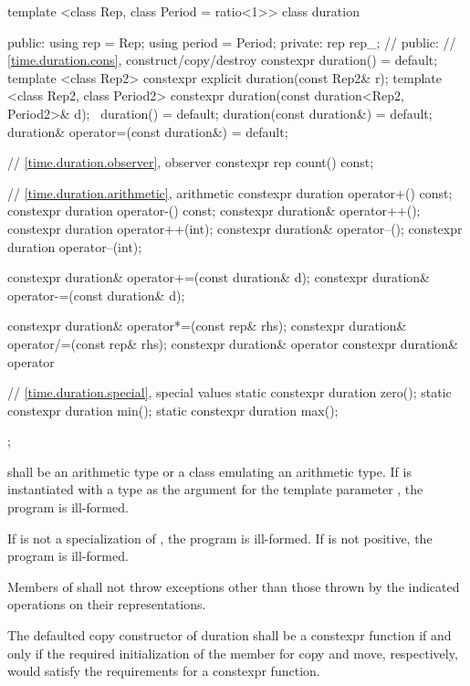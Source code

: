 %
\begin{codeblock}
template <class Rep, class Period = ratio<1>>
class duration {
public:
  using rep    = Rep;
  using period = Period;
private:
  rep rep_;  // \expos
public:
  // \ref{time.duration.cons}, construct/copy/destroy
  constexpr duration() = default;
  template <class Rep2>
      constexpr explicit duration(const Rep2& r);
  template <class Rep2, class Period2>
     constexpr duration(const duration<Rep2, Period2>& d);
  ~duration() = default;
  duration(const duration&) = default;
  duration& operator=(const duration&) = default;

  // \ref{time.duration.observer}, observer
  constexpr rep count() const;

  // \ref{time.duration.arithmetic}, arithmetic
  constexpr duration  operator+() const;
  constexpr duration  operator-() const;
  constexpr duration& operator++();
  constexpr duration  operator++(int);
  constexpr duration& operator--();
  constexpr duration  operator--(int);

  constexpr duration& operator+=(const duration& d);
  constexpr duration& operator-=(const duration& d);

  constexpr duration& operator*=(const rep& rhs);
  constexpr duration& operator/=(const rep& rhs);
  constexpr duration& operator%
  constexpr duration& operator%

  // \ref{time.duration.special}, special values
  static constexpr duration zero();
  static constexpr duration min();
  static constexpr duration max();
};
\end{codeblock}

\pnum
{} shall be an arithmetic type or a class emulating an arithmetic type.
If  is instantiated with a  type as the argument for the template
parameter , the program is ill-formed.

\pnum
If  is not a specialization of , the program is ill-formed.
If  is not positive, the program is ill-formed.

\pnum
Members of  shall not throw exceptions other than
those thrown by the indicated operations on their representations.

\pnum
The defaulted copy constructor of duration shall be a
constexpr function if and only if the required initialization
of the member  for copy and move, respectively, would
satisfy the requirements for a constexpr function.

